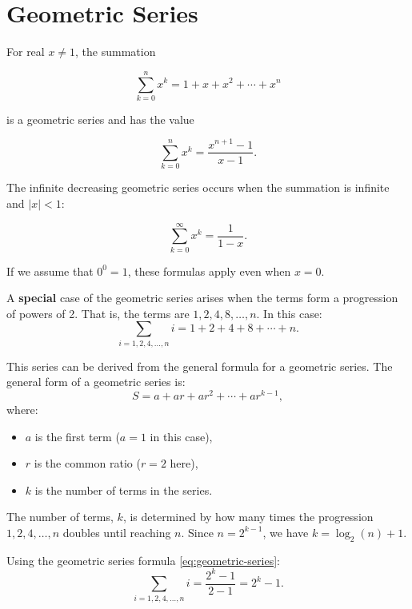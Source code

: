         \section*{Geometric Series}
        For real $x \neq 1$, the summation
        
        \[
            \sum_{k=0}^n x^k=1+x+x^2+\cdots+x^n
        \]
        
        is a geometric series and has the value
        
        \begin{equation}
            \sum_{k=0}^n x^k=\frac{x^{n+1}-1}{x-1} . \label{eq:geometric-series}
        \end{equation}
        
        The infinite decreasing geometric series occurs when the summation is infinite and $|x|<1$:
        
        \begin{equation}
            \sum_{k=0}^{\infty} x^k=\frac{1}{1-x} . \label{eq:infinite-geometric-series}
        \end{equation}
        
        If we assume that $0^0=1$, these formulas apply even when $x=0$.
        
        A \textbf{special} case of the geometric series arises when the terms form a progression of powers of 2. That is, the terms are \(1, 2, 4, 8, \ldots, n\). In this case:
        \[
            \sum_{i=1,2,4,\ldots,n} i = 1 + 2 + 4 + 8 + \cdots + n.
        \]
        
        This series can be derived from the general formula for a geometric series. The general form of a geometric series is:
        \[
            S = a + ar + ar^2 + \cdots + ar^{k-1},
        \]
        where:
        \begin{itemize}
            \item \(a\) is the first term (\(a=1\) in this case),
            \item \(r\) is the common ratio (\(r=2\) here),
            \item \(k\) is the number of terms in the series.
        \end{itemize}
        The number of terms, \(k\), is determined by how many times the progression \(1, 2, 4, \ldots, n\) doubles until reaching \(n\). Since \(n = 2^{k-1}\), we have \(k = \log_2(n) + 1\).
        
        Using the geometric series formula \eqref{eq:geometric-series}:
        \[
            \sum_{i=1,2,4,\ldots,n} i = \frac{2^k - 1}{2 - 1} = 2^k - 1.
        \]
        
